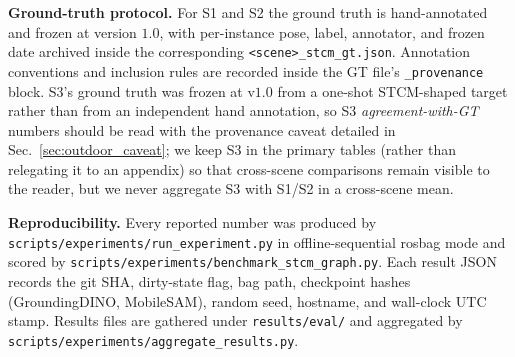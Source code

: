 \noindent\textbf{Ground-truth protocol.}
For S1 and S2 the ground truth is hand-annotated and frozen at
version $1.0$, with per-instance pose, label, annotator, and frozen
date archived inside the corresponding
\texttt{<scene>\_stcm\_gt.json}. Annotation conventions and inclusion
rules are recorded inside the GT file's \texttt{\_provenance} block.
S3's ground truth was frozen at v$1.0$ from a one-shot STCM-shaped
target rather than from an independent hand annotation, so S3
\emph{agreement-with-GT} numbers should be read with the provenance
caveat detailed in Sec.~\ref{sec:outdoor_caveat}; we keep S3 in the
primary tables (rather than relegating it to an appendix) so that
cross-scene comparisons remain visible to the reader, but we never
aggregate S3 with S1/S2 in a cross-scene mean.

\noindent\textbf{Reproducibility.}
Every reported number was produced by
\texttt{scripts/experiments/run\_experiment.py} in offline-sequential
rosbag mode and scored by
\texttt{scripts/experiments/benchmark\_stcm\_graph.py}. Each result
JSON records the git SHA, dirty-state flag, bag path, checkpoint
hashes (GroundingDINO, MobileSAM), random seed, hostname, and
wall-clock UTC stamp. Results files are gathered under
\texttt{results/eval/} and aggregated by
\texttt{scripts/experiments/aggregate\_results.py}.


